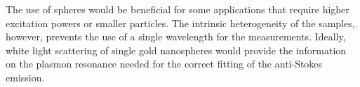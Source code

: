 \documentclass[journal=nalefd,manuscript=letter]{achemso}
\begin{document}
 The use of spheres would be beneficial for some applications that require higher
 excitation powers or smaller particles. The intrinsic heterogeneity of the
 samples, however, prevents the use of a single wavelength for the measurements.
 Ideally, white light scattering of single gold nanospheres would provide the
 information on the plasmon resonance needed for the correct fitting of the
 anti-Stokes emission. 



\end{document}
